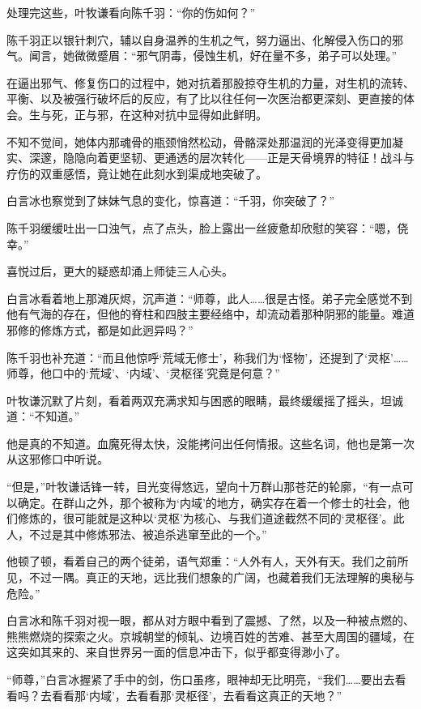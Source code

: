 处理完这些，叶牧谦看向陈千羽：“你的伤如何？”

陈千羽正以银针刺穴，辅以自身温养的生机之气，努力逼出、化解侵入伤口的邪气。闻言，她微微蹙眉：“邪气阴毒，侵蚀生机，好在量不多，弟子可以处理。”

在逼出邪气、修复伤口的过程中，她对抗着那股掠夺生机的力量，对生机的流转、平衡、以及被强行破坏后的反应，有了比以往任何一次医治都更深刻、更直接的体会。生与死，正与邪，在这种对抗中显得如此鲜明。

不知不觉间，她体内那魂骨的瓶颈悄然松动，骨骼深处那温润的光泽变得更加凝实、深邃，隐隐向着更坚韧、更通透的层次转化——正是天骨境界的特征！战斗与疗伤的双重感悟，竟让她在此刻水到渠成地突破了。

白言冰也察觉到了妹妹气息的变化，惊喜道：“千羽，你突破了？”

陈千羽缓缓吐出一口浊气，点了点头，脸上露出一丝疲惫却欣慰的笑容：“嗯，侥幸。”

\vspace{2em}

喜悦过后，更大的疑惑却涌上师徒三人心头。

白言冰看着地上那滩灰烬，沉声道：“师尊，此人……很是古怪。弟子完全感觉不到他有气海的存在，但他的脊柱和四肢主要经络中，却流动着那种阴邪的能量。难道邪修的修炼方式，都是如此迥异吗？”

陈千羽也补充道：“而且他惊呼‘荒域无修士’，称我们为‘怪物’，还提到了‘灵枢’……师尊，他口中的‘荒域’、‘内域’、‘灵枢径’究竟是何意？”

叶牧谦沉默了片刻，看着两双充满求知与困惑的眼睛，最终缓缓摇了摇头，坦诚道：“不知道。”

他是真的不知道。血魔死得太快，没能拷问出任何情报。这些名词，他也是第一次从这邪修口中听说。

“但是，”叶牧谦话锋一转，目光变得悠远，望向十万群山那苍茫的轮廓，“有一点可以确定。在群山之外，那个被称为‘内域’的地方，确实存在着一个修士的社会，他们修炼的，很可能就是这种以‘灵枢’为核心、与我们道途截然不同的‘灵枢径’。此人，不过是其中修炼邪法、被追杀逃窜至此的一个。”

他顿了顿，看着自己的两个徒弟，语气郑重：“人外有人，天外有天。我们之前所见，不过一隅。真正的天地，远比我们想象的广阔，也藏着我们无法理解的奥秘与危险。”

白言冰和陈千羽对视一眼，都从对方眼中看到了震撼、了然，以及一种被点燃的、熊熊燃烧的探索之火。京城朝堂的倾轧、边境百姓的苦难、甚至大周国的疆域，在这突如其来的、来自世界另一面的信息冲击下，似乎都变得渺小了。

“师尊，”白言冰握紧了手中的剑，伤口虽疼，眼神却无比明亮，“我们……要出去看看吗？去看看那‘内域’，去看看那‘灵枢径’，去看看这真正的天地？”

